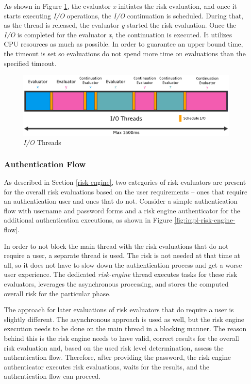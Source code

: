 As shown in Figure \ref{fig:impl-risk-engine-io-threads}, the evaluator \textit{x} initiates the risk evaluation, and once it starts executing \textit{I/O} operations, the \textit{I/O} continuation is scheduled.
During that, as the thread is released, the evaluator \textit{y} started the risk evaluation.
Once the \textit{I/O} is completed for the evaluator \textit{x}, the continuation is executed.
It utilizes CPU resources as much as possible.
In order to guarantee an upper bound time, the timeout is set so evaluations do not spend more time on evaluations than the specified timeout.

\begin{figure}[htbp]
  \centering
  \includegraphics[width=1\textwidth]{img/sections/6-implementation/async.png}
  \caption{\textit{I/O} Threads}
  \label{fig:impl-risk-engine-io-threads}
\end{figure}

\newpage

\subsubsection{Authentication Flow}
As described in Section \ref{risk-engine}, two categories of risk evaluators are present for the overall risk evaluations based on the user requirements -- ones that require an authentication user and ones that do not.
Consider a simple authentication flow with username and password forms and a risk engine authenticator for the additional authentication executions, as shown in Figure \ref{fig:impl-risk-engine-flow}.

In order to not block the main thread with the risk evaluations that do not require a user, a separate thread is used.
The risk is not needed at that time at all, so it does not have to slow down the authentication process and get a worse user experience.
The dedicated \textit{risk-engine} thread executes tasks for these risk evaluators, leverages the asynchronous processing, and stores the computed overall risk for the particular phase.

The approach for later evaluations of risk evaluators that do require a user is slightly different.
The asynchronous approach is used as well, but the risk engine execution needs to be done on the main thread in a blocking manner.
The reason behind this is the risk engine needs to have valid, correct results for the overall risk evaluation and, based on the used risk level determination, assess the authentication flow.
Therefore, after providing the password, the risk engine authenticator executes risk evaluations, waits for the results, and the authentication flow can proceed.


